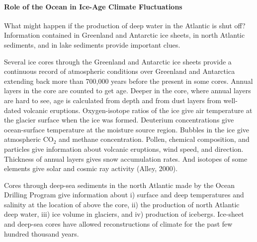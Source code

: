 \paragraph{Role of the Ocean in Ice-Age Climate Fluctuations}
What might happen if the production of deep water in
the Atlantic is shut off? Information contained in Greenland and
Antarctic ice sheets, in north Atlantic sediments, and in lake
sediments provide important clues.

Several ice cores through the Greenland and Antarctic ice sheets
provide a continuous record of atmospheric
conditions over
Greenland and Antarctica extending back more than 700,000 years before
the present in some cores. Annual layers in the core are counted to
get age. Deeper in the core, where annual layers are hard to see, age
is calculated from depth and from dust layers from well-dated volcanic
eruptions. Oxygen-isotope ratios of the ice give air temperature at
the glacier surface when the ice was formed. Deuterium concentrations
give ocean-surface temperature at the moisture source region. Bubbles
in the ice give atmospheric CO$_2$ and methane concentration. Pollen,
chemical composition, and particles give information about volcanic
eruptions, wind speed, and direction. Thickness of annual layers gives
snow accumulation rates. And isotopes of some elements give solar and
cosmic ray activity (Alley, 2000).

Cores through deep-sea sediments in the north Atlantic made by the
Ocean Drilling Program give information about i) surface and deep
temperatures and salinity at the location of above the core, ii) the
production of north Atlantic deep water, iii) ice volume in glaciers,
and iv) production of icebergs. Ice-sheet and deep-sea cores have
allowed reconstructions of climate for the past few hundred thousand
years.

